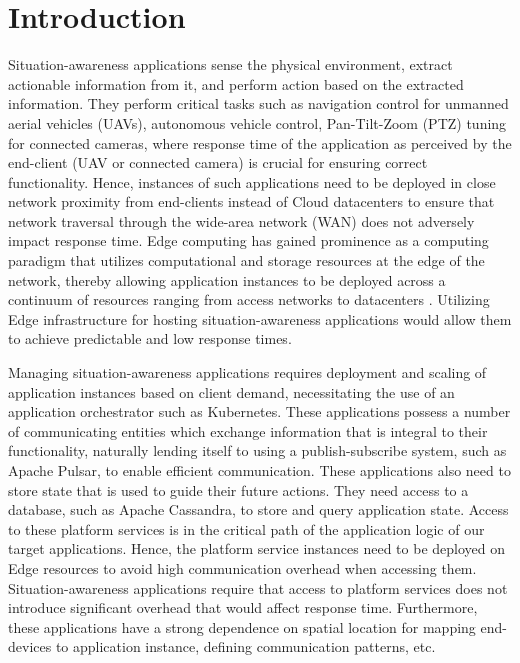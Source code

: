 \chapter{Introduction}
\label{sec:intro}

Situation-awareness applications sense the physical environment, extract actionable information from it, and perform action based on the extracted information. They perform critical tasks such as navigation control for unmanned aerial vehicles (UAVs), autonomous vehicle control, Pan-Tilt-Zoom (PTZ) tuning for connected cameras, where response time of the application as perceived by the end-client (UAV or connected camera) is crucial for ensuring correct functionality. Hence, instances of such applications need to be deployed in close network proximity from end-clients instead of Cloud datacenters to ensure that network traversal through the wide-area network (WAN) does not adversely impact response time. Edge computing has gained prominence as a computing paradigm that utilizes computational and storage resources at the edge of the network, thereby allowing application instances to be deployed across a continuum of resources ranging from access networks to datacenters \cite{ramachandran2021case}. Utilizing Edge infrastructure for hosting situation-awareness applications would allow them to achieve predictable and low response times.
\par Managing situation-awareness applications requires deployment and scaling of application instances based on client demand, necessitating the use of an application orchestrator such as Kubernetes. These applications possess a number of communicating entities which exchange information that is integral to their functionality, naturally lending itself to using a publish-subscribe system, such as Apache Pulsar, to enable efficient communication. These applications also need to store state that is used to guide their future actions. They need access to a database, such as Apache Cassandra, to store and query application state. Access to these platform services is in the critical path of the application logic of our target applications. Hence, the platform service instances need to be deployed on Edge resources to avoid high communication overhead when accessing them. Situation-awareness applications require that access to platform services does not introduce significant overhead that would affect response time. Furthermore, these applications  have a strong dependence on spatial location for mapping end-devices to application instance, defining communication patterns, etc. 

